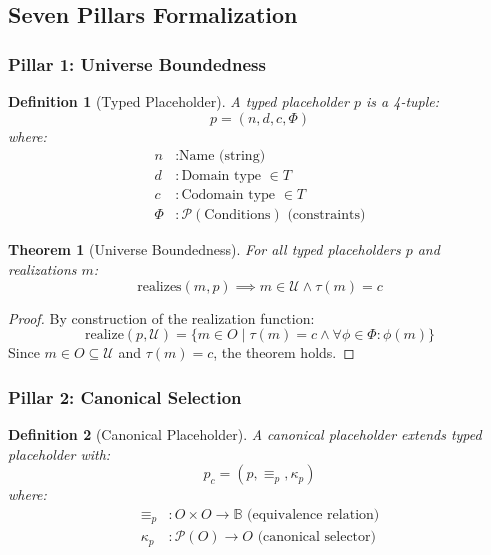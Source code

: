 \documentclass[12pt]{article}
\newtheorem{theorem}{Theorem}
\newtheorem{definition}{Definition}
\begin{document}
\subsection{Seven Pillars Formalization}

\subsubsection{Pillar 1: Universe Boundedness}

\begin{definition}[Typed Placeholder]
A typed placeholder $p$ is a 4-tuple:
\[
p = (n, d, c, \Phi)
\]
where:
\begin{align*}
n & : \text{Name (string)} \\
d & : \text{Domain type } \in T \\
c & : \text{Codomain type } \in T \\
\Phi & : \mathcal{P}(\text{Conditions}) \text{ (constraints)}
\end{align*}
\end{definition}

\begin{theorem}[Universe Boundedness]
For all typed placeholders $p$ and realizations $m$:
\[
\text{realizes}(m, p) \implies m \in \mathcal{U} \land \tau(m) = c
\]
\end{theorem}

\begin{proof}
By construction of the realization function:
\[
\text{realize}(p, \mathcal{U}) = \{ m \in O \mid \tau(m) = c \land \forall \phi \in \Phi: \phi(m) \}
\]
Since $m \in O \subseteq \mathcal{U}$ and $\tau(m) = c$, the theorem holds.
\end{proof}

\subsubsection{Pillar 2: Canonical Selection}

\begin{definition}[Canonical Placeholder]
A canonical placeholder extends typed placeholder with:
\[
p_c = (p, \equiv_p, \kappa_p)
\]
where:
\begin{align*}
\equiv_p & : O \times O \to \mathbb{B} \text{ (equivalence relation)} \\
\kappa_p & : \mathcal{P}(O) \to O \text{ (canonical selector)}
\end{align*}
\end{definition}
\end{document}
